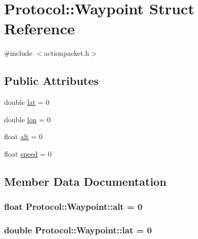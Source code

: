 \hypertarget{struct_protocol_1_1_waypoint}{}\section{Protocol\+:\+:Waypoint Struct Reference}
\label{struct_protocol_1_1_waypoint}


{\ttfamily \#include $<$actionpacket.\+h$>$}

\subsection*{Public Attributes}
\begin{DoxyCompactItemize}
\item 
double \hyperlink{struct_protocol_1_1_waypoint_a29b254ffa54a87da980aa2d0a6dd8e1e}{lat} = 0
\item 
double \hyperlink{struct_protocol_1_1_waypoint_ac5f0dd73ea290deb60ea7464b114faa7}{lon} = 0
\item 
float \hyperlink{struct_protocol_1_1_waypoint_a69b7b1c0eeb8629e07fc929a902a91aa}{alt} = 0
\item 
float \hyperlink{struct_protocol_1_1_waypoint_aa92f0aab1641e5bdb5ea7a9b9d6994ad}{speed} = 0
\end{DoxyCompactItemize}


\subsection{Member Data Documentation}
\hypertarget{struct_protocol_1_1_waypoint_a69b7b1c0eeb8629e07fc929a902a91aa}{}
\subsubsection[{alt}]{\setlength{\rightskip}{0pt plus 5cm}float Protocol\+::\+Waypoint\+::alt = 0}\label{struct_protocol_1_1_waypoint_a69b7b1c0eeb8629e07fc929a902a91aa}
\hypertarget{struct_protocol_1_1_waypoint_a29b254ffa54a87da980aa2d0a6dd8e1e}{}
\subsubsection[{lat}]{\setlength{\rightskip}{0pt plus 5cm}double Protocol\+::\+Waypoint\+::lat = 0}\label{struct_protocol_1_1_waypoint_a29b254ffa54a87da980aa2d0a6dd8e1e}
\hypertarget{struct_protocol_1_1_waypoint_ac5f0dd73ea290deb60ea7464b114faa7}{}
